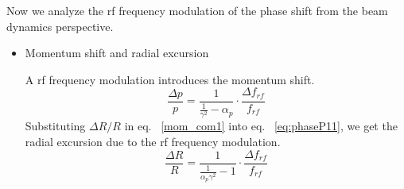 Now we analyze the rf frequency modulation of the phase shift from the beam dynamics perspective.
\begin{itemize}

	\item Momentum shift and radial excursion

A rf frequency modulation introduces the momentum shift. 
\begin{equation}
\frac{\Delta{p}}{p}  = \frac{1}{\frac{1}{\gamma^2}-\alpha_{\mathit{p}}}\cdot \frac{\Delta f_{\mathit{rf}}}{f_{\mathit{rf}}}
\label{eq:phaseP11}
\end{equation}
Substituting ${\Delta R}/{R}$ in eq. ~\ref{mom_com1} into eq. ~\ref{eq:phaseP11}, we get the radial excursion due to the rf frequency modulation.
\begin{equation}
\label{eq:phaseR}
\frac{\Delta{R}}{R} =\frac{1}{{\frac{1}{\alpha_{\mathit{p}}\gamma^2}-1}}\cdot\frac{\Delta f_{\mathit{rf}}}{f_{\mathit{rf}}}
\end{equation}


\end{itemize}
